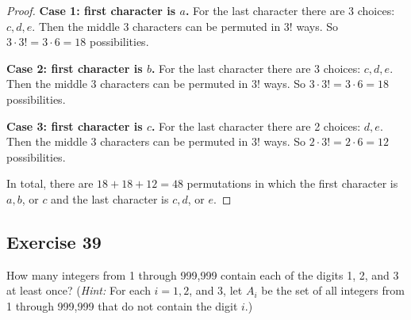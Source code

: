 \documentclass[14pt]{extarticle}
\begin{document}
\begin{proof}
{\bf Case 1: first character is $a$.} For the last character there are 3 choices: \(c, d, e\). Then the middle
3 characters can be permuted in \(3!\) ways. So \(3 \cdot 3! = 3 \cdot 6 = 18\) possibilities.

{\bf Case 2: first character is $b$.} For the last character there are 3 choices: \(c, d, e\). Then the middle
3 characters can be permuted in \(3!\) ways. So \(3 \cdot 3! = 3 \cdot 6 = 18\) possibilities.

{\bf Case 3: first character is $c$.} For the last character there are 2 choices: \(d, e\). Then the middle
3 characters can be permuted in \(3!\) ways. So \(2 \cdot 3! = 2 \cdot 6 = 12\) possibilities.

In total, there are \(18+18+12 = 48\) permutations in which the first character is \(a, b\), or $c$ and the last 
character is \(c, d\), or $e$.
\end{proof}

\subsection{Exercise 39}
How many integers from 1 through 999,999 contain each of the digits 1, 2, and 3 at least once? ({\it Hint:} For each 
\(i = 1, 2\), and 3, let \(A_i\) be the set of all integers from 1 through 999,999 that do not contain the digit $i$.)
\end{document}
